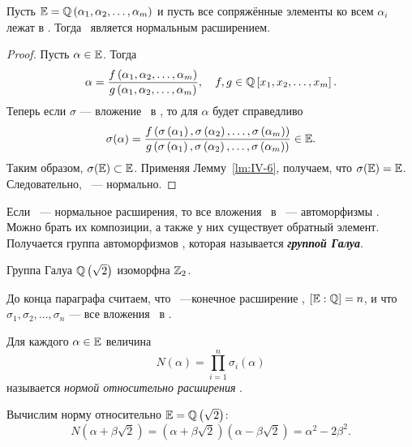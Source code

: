 \begin{ntheorem}
\label{thm:IV-9}
    Пусть $\mathbb{E} = \mathbb{Q}\left( \alpha_1, \alpha_2, \dots, \alpha_m \right)$ и пусть все сопряжённые элементы ко всем $\alpha_i$ лежат в \EE. Тогда \EE~является нормальным расширением.
\end{ntheorem}
\begin{proof}
    Пусть $\alpha \in \mathbb{E}$. Тогда
    \[
        \alpha = \frac{f\left(\alpha_1, \alpha_2, \dots, \alpha_m\right)}{g\left(\alpha_1, \alpha_2, \dots, \alpha_m\right)},
        \quad
        f, g \in \mathbb{Q}\left[x_1, x_2, \dots, x_m\right].
    \]
    Теперь если $\sigma$ --- вложение \EE~в \CC, то для $\alpha$ будет справедливо
    \[
        \sigma(\alpha) = \frac{f\left(\sigma\left(\alpha_1\right), \sigma\left(\alpha_2\right), \dots, \sigma\left(\alpha_m\right)\right)}{g\left(\sigma\left(\alpha_1\right), \sigma\left(\alpha_2\right), \dots, \sigma\left(\alpha_m\right)\right)} \in \mathbb{E}.
    \]
    Таким образом, $\sigma(\mathbb{E}) \subset \mathbb{E}$. Применяя Лемму~\ref{lm:IV-6}, получаем, что $\sigma(\mathbb{E}) = \mathbb{E}$. Следовательно, \EE~--- нормально. 
\end{proof}

\begin{remark}
    Если \EE~--- нормальное расширения, то все вложения \EE~в \CC~--- автоморфизмы \EE. Можно брать их композиции, а также у них существует обратный элемент. Получается группа автоморфизмов \EE, которая называется \textbf{\emph{группой Галуа}}.
\end{remark}

\begin{example}
    Группа Галуа $\mathbb{Q}\left( \sqrt{2} \right)$ изоморфна $\mathbb{Z}_2$.
\end{example}

До конца параграфа считаем, что \EE~---конечное расширение \QQ, $[\mathbb{E} : \mathbb{Q}] = n$, и что $\sigma_1, \sigma_2, \dots, \sigma_n$ --- все вложения \EE~в \CC.

\begin{ndefinition}
\label{def:IV_extension-norm}
    Для каждого $\alpha \in \mathbb{E}$ величина
    \[
        N(\alpha) = \prod_{i=1}^{n} \sigma_i(\alpha)
    \]
    называется \emph{нормой относительно расширения \EE}.
\end{ndefinition}

\begin{example}
    Вычислим норму относительно $\mathbb{E} = \mathbb{Q}\left( \sqrt{2} \right)$:
    \[
        N\left( \alpha + \beta\sqrt{2} \right)
        = \left(\alpha + \beta \sqrt{2}\right)\left(\alpha - \beta \sqrt{2}\right)
        = \alpha^2 - 2\beta^2.
    \]
\end{example}

